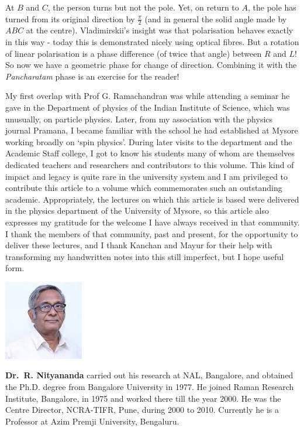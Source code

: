At $B$ and $C$, the person turns but not the pole. Yet, on return to $A$, the pole
has turned from its original direction by $\frac{\pi}{2}$ (and in general the solid angle made
by $ABC$ at the centre). Vladimirskii's insight was that polarisation behaves
exactly in this way - today this is demonstrated nicely using optical fibres.
But a rotation of linear polarisation is a phase difference (of twice that angle)
between $R$ and $L$! So now we have a geometric phase for change of direction.
Combining it with the \textit{Pancharatam} phase is an exercise for the reader!

My first overlap with Prof G. Ramachandran was while attending a seminar he gave in the
Department of physics of the Indian Institute of Science, which was unusually, on particle
physics. Later, from my association with the physics journal Pramana, I became familiar with the school he had
established at Mysore working broadly on `spin physics'. During later visits to the
department and the Academic Staff college, I got to know his students many of whom are
themselves dedicated teachers and researchers and contributors to this volume. This kind
of impact and legacy is quite rare in the university system and I am privileged to contribute this
article to a volume which commemorates such an outstanding academic. Appropriately, the lectures on
which this article is based were delivered in the physics department of the University of
Mysore, so this article also expresses my gratitude for the welcome I have always received in
that community. I thank the members  of  that community,  past  and present,  for the  opportunity to 
deliver  these lectures,  and I thank Kanchan and Mayur for their  help with transforming  my handwritten   
notes  into this  still imperfect,  but I hope useful form. 
\vskip 1cm


\centerline{\includegraphics[scale=0.9]{authorsphotos/Prof_Rajaram_Nityananda.jpg}} 
\bigskip

\noindent
\textbf{Dr.\ R. Nityananda} carried out his research at NAL, Bangalore, and obtained the Ph.D. degree from Bangalore University in 1977. He joined Raman Research Institute, Bangalore, in 1975 and worked there till the year 2000.  He was the Centre Director, NCRA-TIFR, Pune, during 2000 to 2010. Currently he is a Professor at Azim Premji University, Bengaluru.

